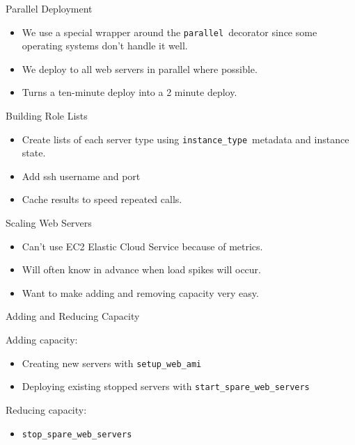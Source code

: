 \documentclass{beamer}
\begin{document}
\begin{frame}{Parallel Deployment}

\begin{itemize}
\item We use a special wrapper around the \texttt{parallel}\ decorator since
some operating systems don't handle it well. 
\item We deploy to all web servers in parallel where possible.
\item Turns a ten-minute deploy into a 2 minute deploy.
\end{itemize}

\end{frame}

\begin{frame}{Building Role Lists}

\begin{itemize}
\item Create lists of each server type using \texttt{instance\_type}\
  metadata and instance state.
\item Add ssh username and port
\item Cache results to speed repeated calls.
\end{itemize}

\end{frame}

\begin{frame}{Scaling Web Servers}

\begin{itemize}
\item Can't use EC2 Elastic Cloud Service because of metrics.
\item Will often know in advance when load spikes will occur.
\item Want to make adding and removing capacity very easy.
\end{itemize}

\end{frame}

\begin{frame}{Adding and Reducing Capacity}

Adding capacity:

\begin{itemize}
\item Creating new servers with \texttt{setup\_web\_ami}
\item Deploying existing stopped servers with
  \texttt{start\_spare\_web\_servers}
\end{itemize}

Reducing capacity:

\begin{itemize}
\item \texttt{stop\_spare\_web\_servers}
\end{itemize}
\end{frame}
\end{document}
